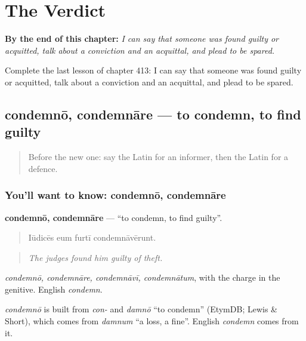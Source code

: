 
\chapter{The Verdict}
\label{ch:la-the-verdict}

\begin{chapteropening}
\textbf{By the end of this chapter:} \emph{I can say that someone was found guilty or acquitted, talk about a conviction and an acquittal, and plead to be spared.}

Complete the last lesson of chapter 413: I can say that someone was found guilty or acquitted, talk about a conviction and an acquittal, and plead to be spared.
\end{chapteropening}

\section[condemnō, condemnāre]{condemnō, condemnāre — to condemn, to find guilty}

\label{lesson:LA-C413-condemno}



\begin{quote}
Before the new one: say the Latin for an informer, then the Latin for a defence.
\end{quote}

\subsection*{You'll want to know: condemnō, condemnāre}
\textbf{condemnō, condemnāre} — \textquotedblleft{}to condemn, to find guilty\textquotedblright{}.

\begin{quote}
Iūdicēs eum furtī condemnāvērunt.
\end{quote}

\begin{quote}
\emph{The judges found him guilty of theft.}
\end{quote}

\emph{condemnō, condemnāre, condemnāvī, condemnātum}, with the charge in the genitive. English \emph{condemn}.

\begin{cousinweb}
\emph{condemnō} is built from \emph{con-} and \emph{damnō} \textquotedblleft{}to condemn\textquotedblright{} (EtymDB; Lewis \& Short), which comes from \emph{damnum} \textquotedblleft{}a loss, a fine\textquotedblright{}. English \emph{condemn} comes from it.
\end{cousinweb}

